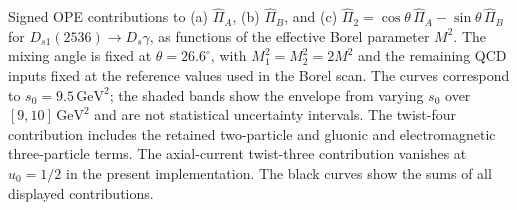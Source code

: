 \caption{Signed OPE contributions to (a) $\widehat\Pi_A$,
(b) $\widehat\Pi_B$, and (c)
$\widehat\Pi_2=\cos\theta\,\widehat\Pi_A
-\sin\theta\,\widehat\Pi_B$ for $D_{s1}(2536)\to D_s\gamma$,
as functions of the effective Borel parameter $M^2$.
The mixing angle is fixed at $\theta=26.6^\circ$, with
$M_1^2=M_2^2=2M^2$ and the remaining QCD inputs fixed at
the reference values used in the Borel scan.
The curves correspond to $s_0=9.5\,\mathrm{GeV}^2$;
the shaded bands show the envelope from varying
$s_0$ over $[9,10]\,\mathrm{GeV}^2$ and are not statistical
uncertainty intervals. The twist-four contribution includes
the retained two-particle and gluonic and electromagnetic
three-particle terms. The axial-current twist-three contribution
vanishes at $u_0=1/2$ in the present implementation.
The black curves show the sums of all displayed contributions.}
